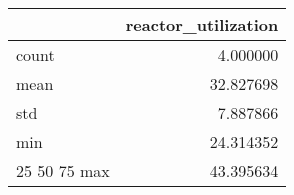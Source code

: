 \begin{tabular}{lr}
\toprule
 & reactor\_utilization \\
\midrule
count & 4.000000 \\
mean & 32.827698 \\
std & 7.887866 \\
min & 24.314352 \\
25%
50%
75%
max & 43.395634 \\
\bottomrule
\end{tabular}

